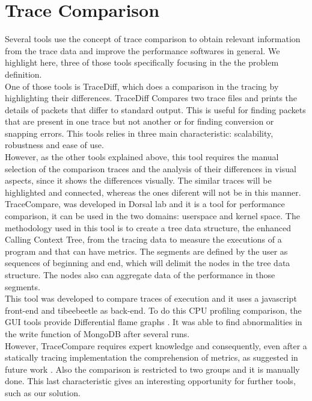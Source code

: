 \section{Trace Comparison}
Several tools use the concept of trace comparison to obtain relevant information from the trace data and improve the performance softwares in general. We highlight here, three of those tools specifically focusing in the the problem definition.\\
One of those tools is TraceDiff\cite{trace_diff}, which does a comparison in the tracing by highlighting their differences. TraceDiff Compares  two  trace files and prints the details of packets that differ to standard output. This is useful for finding packets that are  present  in one trace but not another or for finding conversion or snapping errors. This tools relies in three main characteristic: scalability, robustness and ease of use. \\
However, as the other tools explained above, this tool requires the manual selection of the comparison traces and the analysis of their differences in visual aspects, since it shows the differences visually. The similar traces will be highlighted and connected, whereas the ones diferent will not be in this manner. \\
TraceCompare, was developed in Dorsal lab \cite{tracecompare} and it is a tool for performance comparison, it can be used in the two domains: userspace and kernel space. 
The methodology used in this tool is to create a tree data structure, the enhanced Calling Context Tree, from the tracing data to measure the executions of a program and that can have metrics. The segments are defined by the user as sequences of beginning and end, which will delimit the nodes in the tree data structure. The nodes also can aggregate data of the performance in those segments. \\
This tool was developed to compare traces of execution and it uses a javascript front-end and tibeebeetle as back-end. To do this CPU profiling comparison, the GUI tools provide Differential flame graphs \cite{differential_flame}. It was able to find abnormalities in the write function of MongoDB after several runs. \\
However, TraceCompare requires expert knowledge and consequently, even after a statically tracing implementation the comprehension of metrics, as suggested in future work \cite{doray_thesis}. Also the comparison is restricted to two groups and it is manually done. This last characteristic gives an interesting opportunity for further tools, such as our solution. 
